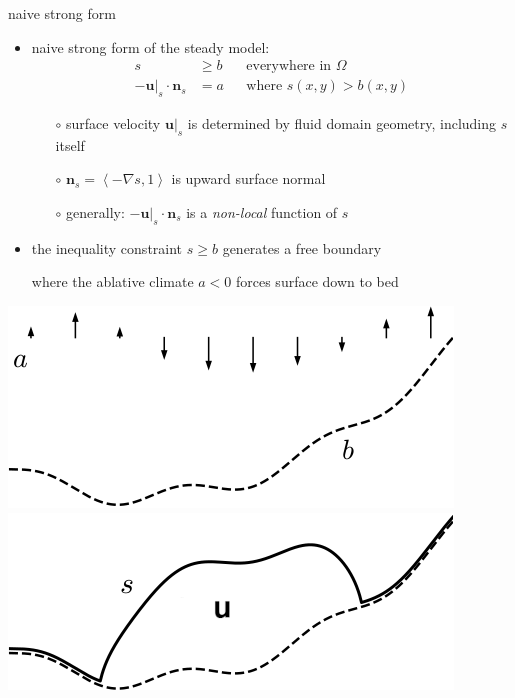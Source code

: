 \documentclass[svgnames,
               hyperref={colorlinks,citecolor=DeepPink4,linkcolor=FireBrick,urlcolor=Maroon},
               usepdftitle=false]  %
               {beamer}
\newcommand{\grad}{\nabla}
\newcommand{\bn}{\mathbf{n}}
\newcommand{\bu}{\mathbf{u}}
\begin{document}
\begin{frame}{naive strong form}

\begin{itemize}
\item naive strong form of the steady model: %
\begin{align*}
s &\ge b                    & &\text{everywhere in } \Omega \\
-\bu|_s \cdot \bn_s &= a    & &\text{where } s(x,y) > b(x,y)
\end{align*}

    \begin{itemize}
    \item[$\circ$] surface velocity $\bu|_s$ is determined by fluid domain geometry, including $s$ itself
    \item[$\circ$] $\bn_s=\left<-\grad s,1\right>$ is upward surface normal
    \item[$\circ$] generally: $-\bu|_s \cdot \bn_s$ is a \emph{non-local} function of $s$
    \end{itemize}
\item<2> the inequality constraint $s \ge b$ \alert{generates a free boundary}

where the ablative climate $a < 0$ forces surface down to bed
\end{itemize}

\bigskip
\hfill \mbox{\includegraphics[height=0.2\textheight]{images/domain-data.png} \hspace{7mm} \includegraphics[height=0.2\textheight]{images/domain-velocity.png}}
\end{frame}
\end{document}
